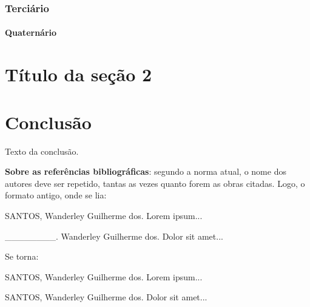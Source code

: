 \documentclass[a4paper,12pt,oneside,onecolumn,final,fleqn]{repUERJ}
\begin{document}
\subsection{Terciário}

\Blindtext %

\subsubsection{Quaternário}

\Blindtext %
\chapter{T\'itulo da seção 2}

\Blindtext %

\chapter*{Conclusão}

Texto da conclusão.

\backmatter


    \textbf{Sobre as referências bibliográficas}: segundo a norma atual, o nome dos autores deve ser repetido, tantas as vezes quanto forem as obras citadas. Logo, o formato antigo, onde se lia:

    SANTOS, Wanderley Guilherme dos. Lorem ipsum...
    
    \_\_\_\_\_\_\_\_. Wanderley Guilherme dos. Dolor sit amet...
    
    Se torna:
    
    SANTOS, Wanderley Guilherme dos. Lorem ipsum...
    
    SANTOS, Wanderley Guilherme dos. Dolor sit amet...
\end{document}
